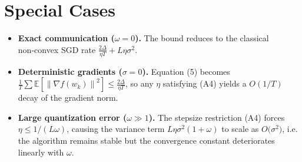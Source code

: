 \documentclass{article}
\newcommand{\E}{\mathbb{E}}
\newcommand{\norm}[1]{\left\|#1\right\|}
\begin{document}
\section*{Special Cases}
\begin{itemize}
\item \textbf{Exact communication ($\omega=0$).}
The bound reduces to the classical non‑convex SGD rate
$\frac{2\Delta}{\eta T}+L\eta\sigma^{2}$.
\item \textbf{Deterministic gradients ($\sigma=0$).}
Equation (5) becomes
$\frac{1}{T}\sum\E[\norm{\nabla f(w_k)}^{2}]
\le \frac{2\Delta}{\eta T}$,
so any $\eta$ satisfying (A4) yields a $O(1/T)$ decay of the gradient norm.
\item \textbf{Large quantization error ($\omega\gg 1$).}
The stepsize restriction (A4) forces $\eta\le 1/(L\omega)$,
causing the variance term $L\eta\sigma^{2}(1+\omega)$ to scale as
$O\bigl(\sigma^{2}\bigr)$, i.e. the algorithm remains stable but the
convergence constant deteriorates linearly with $\omega$.
\end{itemize}
\end{document}
